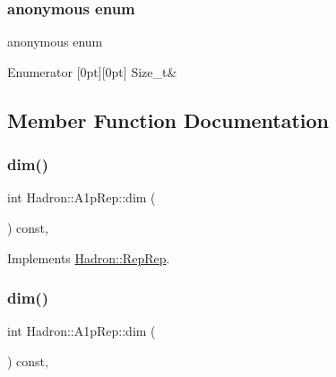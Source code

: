 \subsubsection{\texorpdfstring{anonymous enum}{anonymous enum}}
{\footnotesize\ttfamily anonymous enum}

\begin{DoxyEnumFields}{Enumerator}
[0pt][0pt]{}\mbox{\label{structHadron_1_1A1pRep_aee29032db5723fb7dc4f0f755c626a72a159086896626ac9045fc5cda95283a1a}} 
Size\+\_\+t&\\
\hline

\end{DoxyEnumFields}


\subsection{Member Function Documentation}
\mbox{\label{structHadron_1_1A1pRep_a79006cfd063396120fffa57b1280949e}} 
\subsubsection{\texorpdfstring{dim()}{dim()}\hspace{0.1cm}{\footnotesize\ttfamily [1/5]}}
{\footnotesize\ttfamily int Hadron\+::\+A1p\+Rep\+::dim (\begin{DoxyParamCaption}{ }\end{DoxyParamCaption}) const\hspace{0.3cm}{\ttfamily [inline]}, {\ttfamily [virtual]}}



Implements \mbox{\hyperlink{structHadron_1_1RepRep_a92c8802e5ed7afd7da43ccfd5b7cd92b}{Hadron\+::\+Rep\+Rep}}.

\mbox{\label{structHadron_1_1A1pRep_a79006cfd063396120fffa57b1280949e}} 
\subsubsection{\texorpdfstring{dim()}{dim()}\hspace{0.1cm}{\footnotesize\ttfamily [2/5]}}
{\footnotesize\ttfamily int Hadron\+::\+A1p\+Rep\+::dim (\begin{DoxyParamCaption}{ }\end{DoxyParamCaption}) const\hspace{0.3cm}{\ttfamily [inline]}, {\ttfamily [virtual]}}




